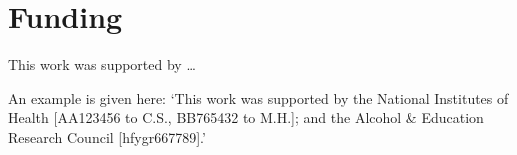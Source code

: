\documentclass{bioinfo}
\begin{document}
\section*{Funding}

This work was supported by \dots

An example is given here: ‘This work was supported by the National Institutes of Health [AA123456 to C.S., BB765432 to M.H.]; and the Alcohol \& Education Research Council [hfygr667789].’
\vspace*{-12pt}





\end{document}
